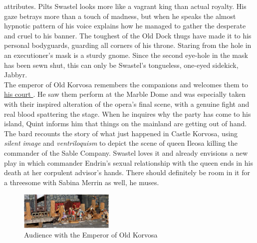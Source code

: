 attributes. Pilts Swastel looks more like a vagrant king than actual royalty. His gaze betrays more than a touch of madness, but when he speaks the almost hypnotic pattern of his voice explains how he managed to gather the desperate and cruel to his banner. The toughest of the Old Dock thugs have made it to his personal bodyguards, guarding all corners of his throne. Staring from the hole in an executioner's mask is a sturdy gnome. Since the second eye-hole in the mask has been sewn shut, this can only be Swastel's tongueless, one-eyed sidekick, Jabbyr.\\

The emperor of Old Korvosa remembers the companions and welcomes them to\hyperref[fig:Audience-with-the-Emperor-of-Old-Korvosa-548846605]{ his court } . He saw them perform at the Marble Dome and was especially taken with their inspired alteration of the opera's final scene, with a genuine fight and real blood spattering the stage. When he inquires why the party has come to his island, Quint informs him that things on the mainland are getting out of hand. The bard recounts the story of what just happened in Castle Korvosa, using  {\itshape silent image} and  {\itshape ventriloquism} to depict the scene of queen Ileosa killing the commander of the Sable Company. Swastel loves it and already envisions a new play in which commander Endrin's sexual relationship with the queen ends in his death at her corpulent advisor's hands. There should definitely be room in it for a threesome with Sabina Merrin as well, he muses. \\

\begin{figure}[h]
	\centering
	\includegraphics[width=0.4\textwidth]{images/Audience-with-the-Emperor-of-Old-Korvosa-548846605_mod.jpg}
	\caption{Audience with the Emperor of Old Korvosa}
	\label{fig:Audience-with-the-Emperor-of-Old-Korvosa-548846605}
\end{figure}

